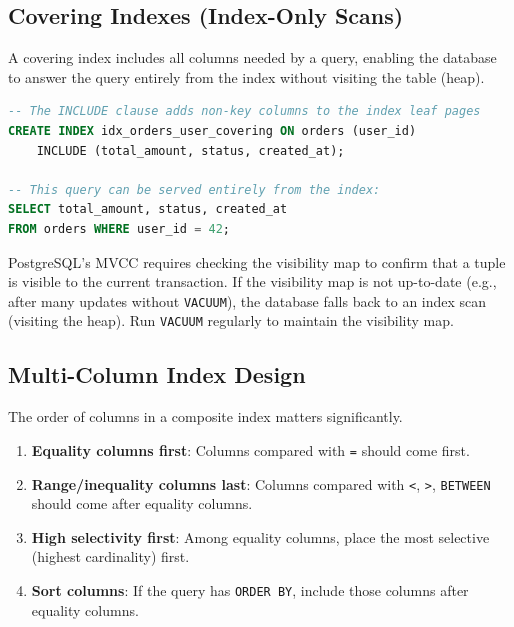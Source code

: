 \documentclass[12pt,a4paper]{article}
\begin{document}
\subsection{Covering Indexes (Index-Only Scans)}

A covering index includes all columns needed by a query, enabling the database to answer the query entirely from the index without visiting the table (heap).

\begin{lstlisting}[language=SQL, caption={Covering indexes in PostgreSQL 11+}]
-- The INCLUDE clause adds non-key columns to the index leaf pages
CREATE INDEX idx_orders_user_covering ON orders (user_id)
    INCLUDE (total_amount, status, created_at);

-- This query can be served entirely from the index:
SELECT total_amount, status, created_at
FROM orders WHERE user_id = 42;
\end{lstlisting}

\begin{warnbox}
PostgreSQL's MVCC requires checking the visibility map to confirm that a tuple is visible to the current transaction. If the visibility map is not up-to-date (e.g., after many updates without \texttt{VACUUM}), the database falls back to an index scan (visiting the heap). Run \texttt{VACUUM} regularly to maintain the visibility map.
\end{warnbox}

\subsection{Multi-Column Index Design}

The order of columns in a composite index matters significantly.

\begin{tipbox}
\begin{enumerate}
    \item \textbf{Equality columns first}: Columns compared with \texttt{=} should come first.
    \item \textbf{Range/inequality columns last}: Columns compared with \texttt{<}, \texttt{>}, \texttt{BETWEEN} should come after equality columns.
    \item \textbf{High selectivity first}: Among equality columns, place the most selective (highest cardinality) first.
    \item \textbf{Sort columns}: If the query has \texttt{ORDER BY}, include those columns after equality columns.
\end{enumerate}
\end{tipbox}
\end{document}
